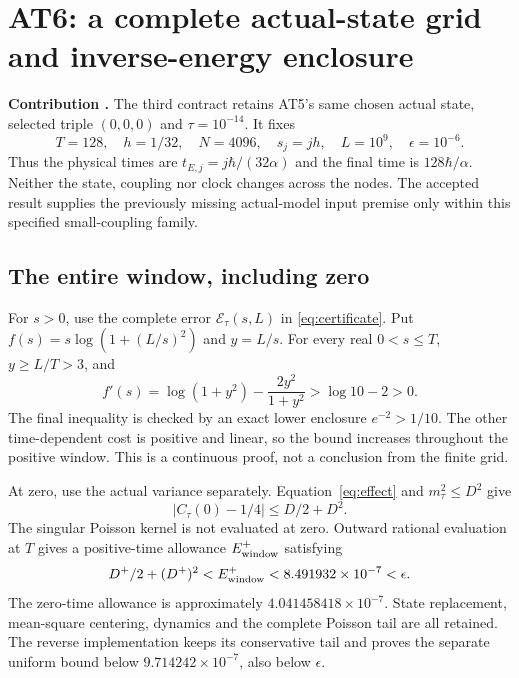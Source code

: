 \section{AT6: a complete actual-state grid and inverse-energy enclosure}
\label{sec:at6}

\textbf{Contribution .} The third contract retains
AT5's same chosen actual state, selected triple $(0,0,0)$ and
$\tau=10^{-14}$. It fixes
\begin{equation}
 T=128,\quad h=1/32,\quad N=4096,\quad s_j=jh,
 \quad L=10^9,\quad\epsilon=10^{-6}.
 \label{eq:grid-design}
\end{equation}
Thus the physical times are $t_{E,j}=j\hbar/(32\alpha)$ and the final time is
$128\hbar/\alpha$. Neither the state, coupling nor clock changes across the
nodes. The accepted result supplies the previously missing actual-model input
premise only within this specified small-coupling family.

\subsection{The entire window, including zero}
For $s>0$, use the complete error $\mathcal E_\tau(s,L)$ in
\eqref{eq:certificate}. Put $f(s)=s\log(1+(L/s)^2)$ and $y=L/s$.
For every real $0<s\le T$, $y\ge L/T>3$, and
\begin{equation}
 f'(s)=\log(1+y^2)-\frac{2y^2}{1+y^2}
 >\log 10-2>0.
 \label{eq:monotone}
\end{equation}
The final inequality is checked by an exact lower enclosure $e^{-2}>1/10$.
The other time-dependent cost is positive and linear, so the bound increases
throughout the positive window. This is a continuous proof, not a conclusion
from the finite grid.

At zero, use the actual variance separately. Equation~\eqref{eq:effect} and
$m_\tau^2\le D^2$ give
\begin{equation}
 |C_\tau(0)-1/4|\le D/2+D^2.
 \label{eq:zero-node}
\end{equation}
The singular Poisson kernel is not evaluated at zero. Outward rational
evaluation at $T$ gives a positive-time allowance $E_{\rm window}^+$ satisfying
\begin{equation}
 D^+/2+(D^+)^2<E_{\rm window}^+<8.491932\times10^{-7}<\epsilon.
 \label{eq:window-error}
\end{equation}
The zero-time allowance is approximately $4.041458418\times10^{-7}$.
State replacement, mean-square centering, dynamics and the complete Poisson
tail are all retained. The reverse implementation keeps its conservative tail
and proves the separate uniform bound below $9.714242\times10^{-7}$, also
below $\epsilon$.

